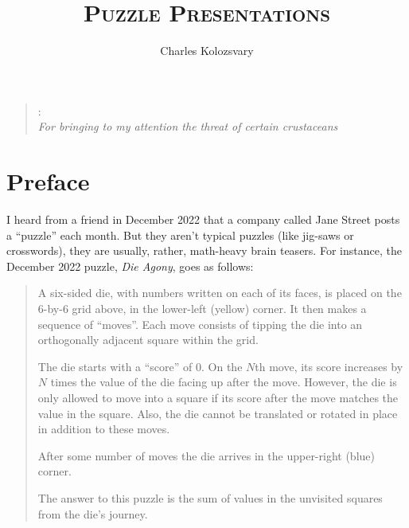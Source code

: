 \documentclass{book}
\begin{document}
\title{{\centering\Huge\textsc{Puzzle Presentations}}}
\author{\Large Charles Kolozsvary}
\date{}

\maketitle

\begin{quote}
{: \\ 
\hfill {\sl For bringing to my attention the threat of certain crustaceans}}
\end{quote}
\chapter*{Preface}
I heard from a friend in December 2022 that a company called Jane Street posts a ``puzzle'' each month. But they aren't typical puzzles (like jig-saws or crosswords), they are usually, rather, math-heavy brain teasers. For instance, the December 2022 puzzle, \emph{Die Agony}, goes as follows:
\[

\]
\begin{quote}
A six-sided die, with numbers written on each of its faces, is placed on the 6-by-6 grid above, in the lower-left (yellow) corner. It then makes a sequence of ``moves''. Each move consists of tipping the die into an orthogonally adjacent square within the grid.

The die starts with a ``score'' of 0. On the $N$th move, its score increases by $N$ times the value of the die facing up after the move. However, the die is only allowed to move into a square if its score after the move matches the value in the square. Also, the die cannot be translated or rotated in place in addition to these moves.

After some number of moves the die arrives in the upper-right (blue) corner.

The answer to this puzzle is the sum of values in the unvisited squares from the die's journey.
\end{quote}
\end{document}

